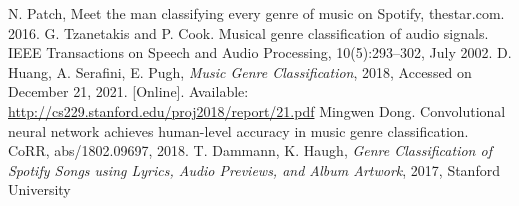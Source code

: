 \documentclass[conference]{IEEEtran}
\begin{document}
\begin{thebibliography}{00}
 N. Patch, Meet the man classifying every genre of music on Spotify,
thestar.com. 2016.
 G. Tzanetakis and P. Cook. Musical genre classification of audio signals. IEEE Transactions on Speech and Audio Processing, 10(5):293–302, July 2002.
 D. Huang, A. Serafini, E. Pugh, \emph{Music Genre Classification}, 2018, Accessed on December 21, 2021. [Online]. Available: \url{http://cs229.stanford.edu/proj2018/report/21.pdf}
 Mingwen Dong. Convolutional neural network achieves human-level accuracy in music genre classification. CoRR, abs/1802.09697, 2018.
 T. Dammann, K. Haugh, \emph{Genre Classification of Spotify Songs using Lyrics, Audio Previews, and Album Artwork}, 2017, Stanford University

\end{thebibliography}
\end{document}
